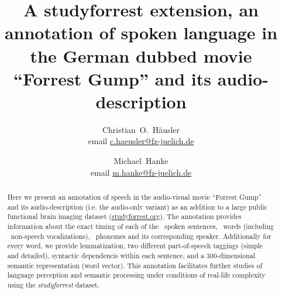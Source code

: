 \documentclass[10pt,a4paper,onecolumn]{article}
\begin{document}



\title{A studyforrest extension, an annotation of spoken language in the German dubbed movie ``Forrest Gump'' and its audio-description}

\author[1, 2]{Christian~O.~Häusler \\ email \href{mailto:c.haeusler@fz-juelich.de}{c.haeusler@fz-juelich.de} }
\author[1, 2]{Michael~Hanke \\ email \href{mailto:m.hanke@fz-juelich.de}{m.hanke@fz-juelich.de} }


\maketitle


\thispagestyle{fancy}
\begin{abstract}
Here we present an annotation of speech in the audio-visual movie ``Forrest Gump'' and its audio-description (i.e. the audio-only variant) as an addition to a large public functional brain imaging dataset (\href{www.studyforrest.org}{studyforrest.org}).
The annotation provides information about the exact timing of each of the \aSentencesAll\ spoken sentences, \aWordsAll\ words (including \aPosNonspeechAll\ non-speech vocalizations), \aPhonesAll\ phonemes and its corresponding speaker.
Additionally for every word, we provide lemmatization, two different part-of-speech taggings (simple and detailed), syntactic dependencis within each sentence, and a 300-dimensional semantic representation (word vector).
This annotation facilitates further studies of language perception and semantic processing under conditions of real-life complexity using the \textit{studyforrest} dataset.
\end{abstract}
\end{document}

